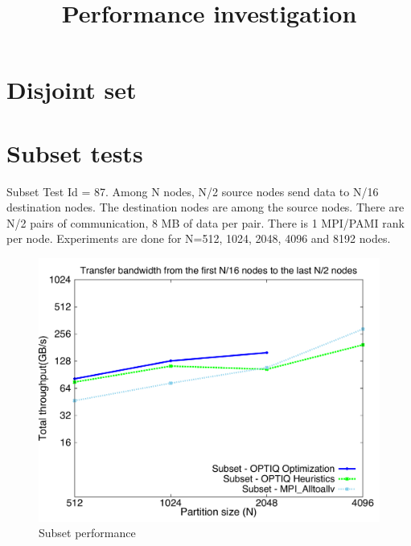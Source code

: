 \documentclass[letter]{article}
\title{Performance investigation}
\begin{document}
\maketitle

\section{Disjoint set}


\section{Subset tests}

Subset Test Id = 87. Among N nodes, N/2 source nodes send data to N/16 destination nodes. The destination nodes are among the source nodes. There are N/2 pairs of communication, 8 MB of data per pair. There is 1 MPI/PAMI rank per node. Experiments are done for N=512, 1024, 2048, 4096 and 8192 nodes.

\begin{figure}[!htb]
\vspace{-0.1in}
\centering
\includegraphics[scale=0.30]{report_figures/constantr_subset.pdf}
\vspace{-0.1in}
\caption{Subset performance}
\vspace{-0.1in}
\label{fig:patterns}
\end{figure}
\end{document}
